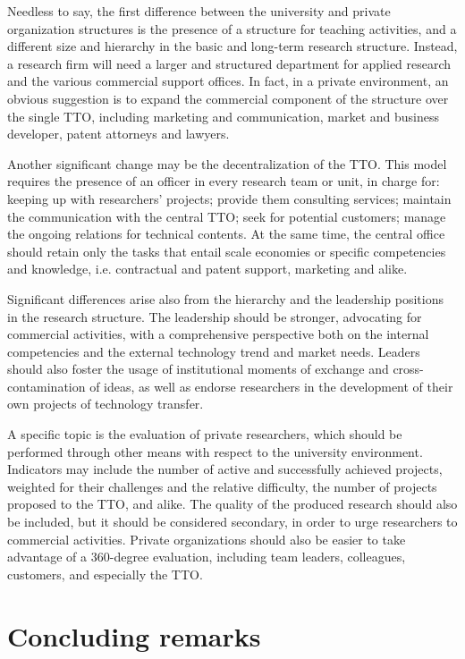 Needless to say, the first difference between the university and private organization structures is the presence of a structure for teaching activities, and a different size and hierarchy in the basic and long-term research structure. Instead, a research firm will need a larger and structured department for applied research and the various commercial support offices. In fact, in a private environment, an obvious suggestion is to expand the commercial component of the structure over the single TTO, including marketing and communication, market and business developer, patent attorneys and lawyers.

Another significant change may be the decentralization of the TTO. This model requires the presence of an officer in every research team or unit, in charge for: keeping up with researchers' projects; provide them consulting services; maintain the communication with the central TTO; seek for potential customers; manage the ongoing relations for technical contents. At the same time, the central office should retain only the tasks that entail scale economies or specific competencies and knowledge, i.e. contractual and patent support, marketing and alike.

Significant differences arise also from the hierarchy and the leadership positions in the research structure. The leadership should be stronger, advocating for commercial activities, with a comprehensive perspective both on the internal competencies and the external technology trend and market needs. Leaders should also foster the usage of institutional moments of exchange and cross-contamination of ideas, as well as endorse researchers in the development of their own projects of technology transfer.

A specific topic is the evaluation of private researchers, which should be performed through other means with respect to the university environment. Indicators may include the number of active and successfully achieved projects, weighted for their challenges and the relative difficulty, the number of projects proposed to the TTO, and alike. The quality of the produced research should also be included, but it should be considered secondary, in order to urge researchers to commercial activities. Private organizations should also be easier to take advantage of a 360-degree evaluation, including team leaders, colleagues, customers, and especially the TTO. 

\section{Concluding remarks}